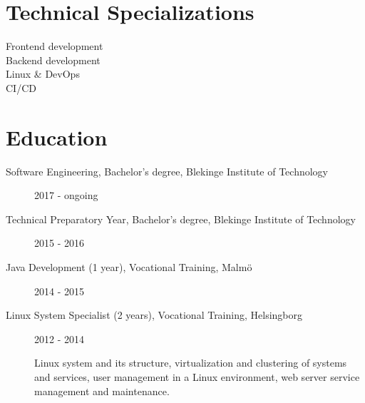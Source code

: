 \documentclass{article}
\begin{document}
\begin{minipage}[t]{0.4\textwidth}
	
	\section*{\textcolor{colorBlue}{Technical Specializations}}
	
	\begin{description}
		\item [ Frontend development ]
		\item [ Backend development ]
		\vspace{-5pt}\item [ Linux \& DevOps ] 
		\vspace{-5pt}\item [ CI/CD ]
		\vspace{-5pt}
	\end{description}
	
\end{minipage}%
\hfill
\begin{minipage}[t]{0.6\textwidth}
	
	\section*{\textcolor{colorBlue}{Education}}
	
	\begin{description}
		\item [ Software Engineering, Bachelor's degree, Blekinge Institute of Technology ] 2017 - ongoing
		\item [ Technical Preparatory Year, Bachelor's degree, Blekinge Institute of Technology ] 2015 - 2016
		\item [ Java Development (1 year), Vocational Training, Malmö ] 2014 - 2015
		\item [ Linux System Specialist (2 years), Vocational Training, Helsingborg ] 2012 - 2014 
		
		Linux system and its structure, virtualization and clustering of systems and services, user management in a Linux environment, web server service management and maintenance.
	\end{description}
	
\end{minipage}%
\vspace{10pt}
\end{document}
